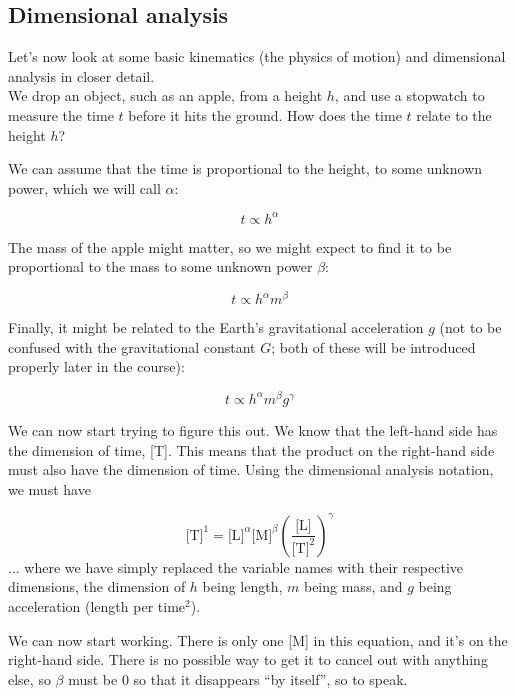 \subsection{Dimensional analysis}

Let's now look at some basic kinematics (the physics of motion) and dimensional analysis in closer detail.\\
We drop an object, such as an apple, from a height $h$, and use a stopwatch to measure the time $t$ before it hits the ground. How does the time $t$ relate to the height $h$?

We can assume that the time is proportional to the height, to some unknown power, which we will call $\alpha$:

\begin{equation*}
 t \propto h^\alpha
\end{equation*}

The mass of the apple might matter, so we might expect to find it to be proportional to the mass to some unknown power $\beta$:

\begin{equation*}
 t \propto h^\alpha m^\beta
\end{equation*}

Finally, it might be related to the Earth's gravitational acceleration $g$ (not to be confused with the gravitational constant $G$; both of these will be introduced properly later in the course):

\begin{equation}
t \propto h^\alpha m^\beta g^\gamma
\end{equation}

We can now start trying to figure this out. We know that the left-hand side has the dimension of time, [T]. This means that the product on the right-hand side must also have the dimension of time. Using the dimensional analysis notation, we must have

\begin{equation}
 \text{[T]}^1 = \text{[L]}^\alpha \text{[M]}^\beta \left( \frac{\text{[L]}}{\text{[T]}^2} \right)^\gamma 
 \end{equation}
 ... where we have simply replaced the variable names with their respective dimensions, the dimension of $h$ being length, $m$ being mass, and $g$ being acceleration (length per time${}^2$).
 
 We can now start working. There is only one [M] in this equation, and it's on the right-hand side. There is no possible way to get it to cancel out with anything else, so $\beta$ must be 0 so that it disappears ``by itself'', so to speak.
 
